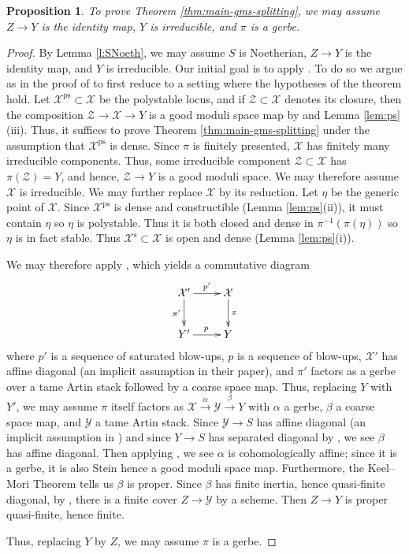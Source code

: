 \documentclass{amsart}
\newtheorem{proposition}[proposition]{Proposition}
\theoremstyle{definition}
\newcommand{\cZ}{\mathcal{Z}}
\newcommand{\cX}{\mathcal{X}}
\newcommand{\cY}{\mathcal{Y}}
\DeclareMathOperator{\ps}{ps}
\DeclareMathOperator{\s}{s}
\begin{document}
	\begin{proposition}\label{prop:gerbe-case}
		To prove Theorem \ref{thm:main-gms-splitting}, we may assume $Z\to Y$ is the identity map, $Y$ is irreducible, and $\pi$ is a gerbe.
		
	\end{proposition}
	\begin{proof}
		By Lemma \ref{l:SNoeth}, we may assume $S$ is Noetherian, $Z\to Y$ is the identity map, and $Y$ is irreducible. Our initial goal is to apply \cite[Theorem 2.11]{ER}. To do so we argue as in the proof of \cite[Theorem 14.11]{ABBDILW} to first reduce to a setting where the hypotheses of the theorem hold. Let $\cX^{\ps}\subset\cX$ be the polystable locus, and if $\cZ\subset\cX$ denotes its closure, then the composition $\cZ\to\cX\to Y$ is a good moduli space map by \cite[Lemma 4.14]{Alper} and Lemma \ref{lem:ps}(iii). Thus, it suffices to prove Theorem \ref{thm:main-gms-splitting} under the assumption that $\cX^{\ps}$ is dense. Since $\pi$ is finitely presented, $\cX$ has finitely many irreducible components. Thus, some irreducible component $\cZ\subset\cX$ has $\pi(\cZ)=Y$, and hence, $\cZ\to Y$ is a good moduli space. We may therefore assume $\cX$ is irreducible. We may further replace $\cX$ by its reduction. Let $\eta$ be the generic point of $\cX$. Since $\cX^{\ps}$ is dense and constructible (Lemma \ref{lem:ps}(ii)), it must contain $\eta$ so $\eta$ is polystable. Thus it is both closed and dense in $\pi^{-1}(\pi(\eta))$ so $\eta$ is in fact stable. Thus $\cX^{\s} \subset \cX$ is open and dense (Lemma \ref{lem:ps}(i)). 
		
		We may therefore apply \cite[Theorem 2.11]{ER}, which yields a commutative diagram
		\[
		\xymatrix{
			\cX'\ar[r]^-{p'}\ar[d]_-{\pi'} & \cX\ar[d]^-{\pi}\\
			Y'\ar[r]^p & Y
		}
		\]
		where $p'$ is a sequence of saturated blow-ups, $p$ is a sequence of blow-ups, $\cX'$ has affine diagonal (an implicit assumption in their paper), and $\pi'$ factors as a gerbe over a tame Artin stack followed by a coarse space map. Thus, replacing $Y$ with $Y'$, we may assume $\pi$ itself factors as $\cX\xrightarrow{\alpha}\cY\xrightarrow{\beta} Y$ with $\alpha$ a gerbe, $\beta$ a coarse space map, and $\cY$ a tame Artin stack. Since $\cY\to S$ has affine diagonal (an implicit assumption in \cite{ER}) and since $Y\to S$ has separated diagonal by \cite[Tag 02X4]{stacks-project}, we see $\beta$ has affine diagonal. Then applying \cite[Proposition 3.13]{Alper}, we see $\alpha$ is cohomologically affine; since it is a gerbe, it is also Stein hence a good moduli space map.  Furthermore, the Keel--Mori Theorem tells us $\beta$ is proper. 
		Since $\beta$ has finite inertia, hence quasi-finite diagonal, by \cite[Theorem 2.7]{EHKV}, there is a finite cover $Z\to\cY$ by a scheme. Then $Z\to Y$ is proper quasi-finite, hence finite.
		
		Thus, replacing $Y$ by $Z$, we may assume $\pi$ is a gerbe.
	\end{proof}
	
\end{document}
